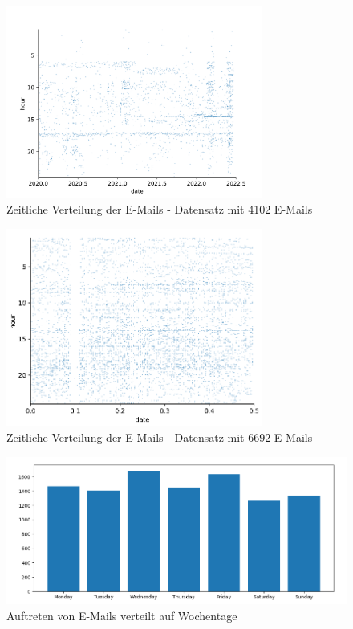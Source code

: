 \begin{figure}
    \centering
    \includegraphics[width=0.75\textwidth]{images/plot.PNG}
    \caption{Zeitliche Verteilung der E-Mails - Datensatz mit 4102 E-Mails} 
    \label{fig:auswertungzeitlich}
\end{figure}

\begin{figure}
    \centering
    \includegraphics[width=0.75\textwidth]{images/merged_plot.PNG}
    \caption{Zeitliche Verteilung der E-Mails - Datensatz mit 6692 E-Mails} 
    \label{fig:auswertungzeitlichmerged}
\end{figure}

\begin{figure}
    \centering
    \includegraphics[width=1\textwidth]{images/received_mails_per_weekday.PNG}
    \caption{Auftreten von E-Mails verteilt auf Wochentage} 
    \label{fig:plotweekdays}
\end{figure}